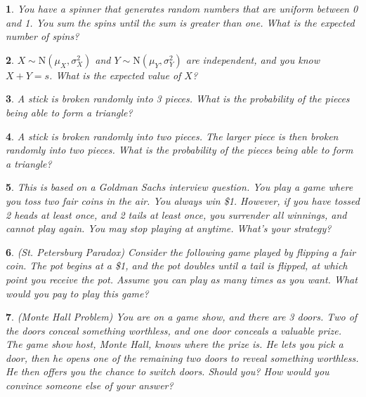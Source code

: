 \documentclass{report}
\newtheorem{problem}{}
\numberwithin{problem}{chapter} %
\begin{document}
\begin{problem}
You have a spinner that generates random numbers that are uniform between 0 and 1. You sum the spins until the sum is greater than one. What is the expected number of spins?
\end{problem}

\begin{problem}
$X \sim \mbox{N}(\mu_X, \sigma^2_X)$ and $Y \sim \mbox{N}(\mu_Y, \sigma^2_Y)$ are independent, and you know $X+Y=s$. What is the expected value of $X$? 
\end{problem}

\begin{problem}
A stick is broken randomly into 3 pieces. What is the probability of the pieces being able to form a triangle?
\end{problem}

\begin{problem}
A stick is broken randomly into two pieces. The larger piece is then broken randomly into two pieces. What is the probability of the pieces being able to form a triangle?
\end{problem}

\begin{problem}
This is based on a Goldman Sachs interview question. You play a game where you toss two fair coins in the air. You always win \$1. However, if you have tossed 2 heads at least once, and 2 tails at least once, you surrender all winnings, and cannot play again. You may stop playing at anytime. What's your strategy? 
\end{problem}

\begin{problem}
(St. Petersburg Paradox) Consider the following game played by flipping a fair coin. The pot begins at a \$1, and the pot doubles until a tail is flipped, at which point you receive the pot. Assume you can play as many times as you want. What would you pay to play this game? 
\end{problem}

\begin{problem}
(Monte Hall Problem) You are on a game show, and there are 3 doors. Two of the doors conceal something worthless, and one door conceals a valuable prize. The game show host, Monte Hall, knows where the prize is. He lets you pick a door, then he opens one of the remaining two doors to reveal something worthless. He then offers you the chance to switch doors. Should you? How would you convince someone else of your answer?
\end{problem}
\end{document}
